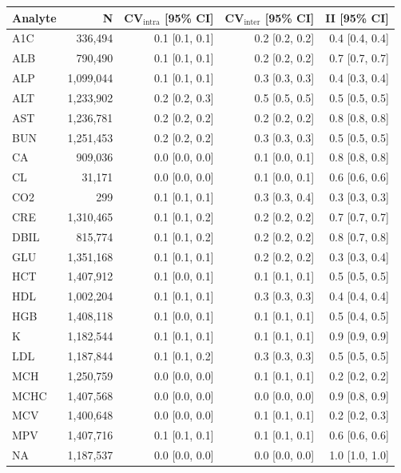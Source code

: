 \begin{table}[ht]
\centering
\footnotesize
\begin{tabular}{lrrrr}
\toprule
Analyte & N & CV$_{\text{intra}}$ [95\% CI] & CV$_{\text{inter}}$ [95\% CI] & II [95\% CI] \\
\midrule
A1C & 336,494 & 0.1 [0.1, 0.1] & 0.2 [0.2, 0.2] & 0.4 [0.4, 0.4] \\
ALB & 790,490 & 0.1 [0.1, 0.1] & 0.2 [0.2, 0.2] & 0.7 [0.7, 0.7] \\
ALP & 1,099,044 & 0.1 [0.1, 0.1] & 0.3 [0.3, 0.3] & 0.4 [0.3, 0.4] \\
ALT & 1,233,902 & 0.2 [0.2, 0.3] & 0.5 [0.5, 0.5] & 0.5 [0.5, 0.5] \\
AST & 1,236,781 & 0.2 [0.2, 0.2] & 0.2 [0.2, 0.2] & 0.8 [0.8, 0.8] \\
BUN & 1,251,453 & 0.2 [0.2, 0.2] & 0.3 [0.3, 0.3] & 0.5 [0.5, 0.5] \\
CA & 909,036 & 0.0 [0.0, 0.0] & 0.1 [0.0, 0.1] & 0.8 [0.8, 0.8] \\
CL & 31,171 & 0.0 [0.0, 0.0] & 0.1 [0.0, 0.1] & 0.6 [0.6, 0.6] \\
CO2 & 299 & 0.1 [0.1, 0.1] & 0.3 [0.3, 0.4] & 0.3 [0.3, 0.3] \\
CRE & 1,310,465 & 0.1 [0.1, 0.2] & 0.2 [0.2, 0.2] & 0.7 [0.7, 0.7] \\
DBIL & 815,774 & 0.1 [0.1, 0.2] & 0.2 [0.2, 0.2] & 0.8 [0.7, 0.8] \\
GLU & 1,351,168 & 0.1 [0.1, 0.1] & 0.2 [0.2, 0.2] & 0.3 [0.3, 0.4] \\
HCT & 1,407,912 & 0.1 [0.0, 0.1] & 0.1 [0.1, 0.1] & 0.5 [0.5, 0.5] \\
HDL & 1,002,204 & 0.1 [0.1, 0.1] & 0.3 [0.3, 0.3] & 0.4 [0.4, 0.4] \\
HGB & 1,408,118 & 0.1 [0.0, 0.1] & 0.1 [0.1, 0.1] & 0.5 [0.4, 0.5] \\
K & 1,182,544 & 0.1 [0.1, 0.1] & 0.1 [0.1, 0.1] & 0.9 [0.9, 0.9] \\
LDL & 1,187,844 & 0.1 [0.1, 0.2] & 0.3 [0.3, 0.3] & 0.5 [0.5, 0.5] \\
MCH & 1,250,759 & 0.0 [0.0, 0.0] & 0.1 [0.1, 0.1] & 0.2 [0.2, 0.2] \\
MCHC & 1,407,568 & 0.0 [0.0, 0.0] & 0.0 [0.0, 0.0] & 0.9 [0.8, 0.9] \\
MCV & 1,400,648 & 0.0 [0.0, 0.0] & 0.1 [0.1, 0.1] & 0.2 [0.2, 0.3] \\
MPV & 1,407,716 & 0.1 [0.1, 0.1] & 0.1 [0.1, 0.1] & 0.6 [0.6, 0.6] \\
NA & 1,187,537 & 0.0 [0.0, 0.0] & 0.0 [0.0, 0.0] & 1.0 [1.0, 1.0] \\

\end{tabular}
\end{table}
